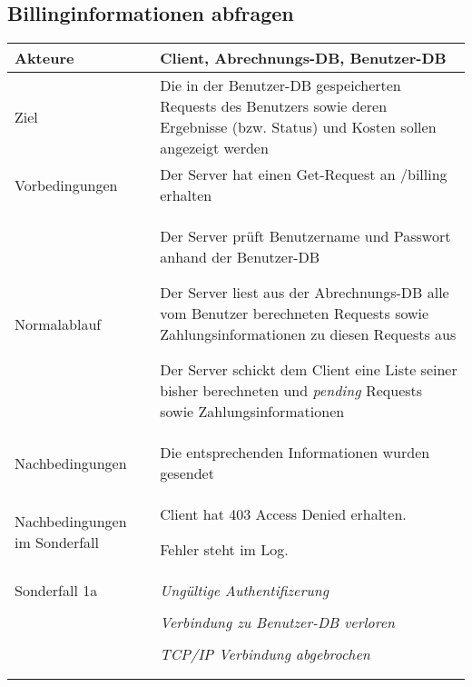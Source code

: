 \documentclass[a4paper,10pt,titlepage,parskip=true]{article}
\makeatletter
\newcommand\novspace{\@minipagetrue}
\newenvironment{owncompactitem}{%
\compactitem
}{%
\@finalstrut\@arstrutbox
\@nameuse{endcompactitem}%
\aftergroup\let\aftergroup\@finalstrut\aftergroup\@gobble
}
\newenvironment{owncompactenum}{%
\compactenum
}{%
\@finalstrut\@arstrutbox
\@nameuse{endcompactenum}%
\aftergroup\let\aftergroup\@finalstrut\aftergroup\@gobble
}
\newcommand{\usecase}[7]
{\subsection{#1}
\setlength{\extrarowheight}{2pt}
\begin{tabular}{|p{0.2\textwidth}|p{0.9\textwidth}|}
\hline
  Akteure & #2\\\hline
  Ziel & #3\\\hline
  Vorbedingungen & \novspace
  	\begin{owncompactitem}[-] #4 \end{owncompactitem} \\\hline
  Normalablauf & \vspace{-7pt}
  	\begin{owncompactenum}[1.] #6 \end{owncompactenum} \\\hline
  Nachbedingungen & \novspace
  	\begin{owncompactitem}[-] #5 \end{owncompactitem} \\\hline
  #7
\end{tabular}
}
\newcommand{\sonderfall}[4][\empty]
{
Sonderfall #2 & \vspace{-10pt}
	\textit{#3}
	\begin{owncompactenum}[{#2}.1] {#4} \end{owncompactenum}
  	\ifthenelse{\equal{#1}{\empty}}
    	{\\\hline} %
    	{\ensuremath{\rightarrow} #1 \\ [+1pt] \hline} %

}
\newcommand{\sondernachbedingung}[1]
{
Nachbedingungen im Sonderfall& \novspace
	\begin{owncompactitem}[-]
		#1
	\end{owncompactitem} \\\hline
}
\makeatother
\begin{document}
\usecase{Billinginformationen abfragen}{Client, Abrechnungs-DB, Benutzer-DB}%
{Die in der Benutzer-DB gespeicherten Requests des Benutzers sowie deren Ergebnisse (bzw. Status) und Kosten sollen angezeigt werden}%
{%
  \item Der Server hat einen Get-Request an /billing erhalten
}
{%
  \item Die entsprechenden Informationen wurden gesendet
}
{%
  \item Der Server prüft Benutzername und Passwort anhand der Benutzer-DB
  \item Der Server liest aus der Abrechnungs-DB alle vom Benutzer berechneten Requests sowie Zahlungsinformationen zu diesen Requests aus
  \item Der Server schickt dem Client eine Liste seiner bisher berechneten und \textit{pending} Requests sowie Zahlungsinformationen
}
{%
  \sondernachbedingung{
	\item Client hat 403 Access Denied erhalten.
	\item Fehler steht im Log.
	}
		\sonderfall[Weiter mit normalem Betrieb]{1a}
    {Ungültige Authentifizerung}
    {
    \item Fehler wird ins Log geschrieben
  	\item Der Client erhält eine entsprechende Fehlermeldung mit HTTP-Status 403 Access Denied
    }
	\sonderfall[Kritischer Fehler, Server ist beendet]{*}%
	{Verbindung zu Benutzer-DB verloren}%
  	{
	\item Der Fehler wird ins Log geschrieben (als schwerwiegender Fehler)
	\item Der Client erhält eine entsprechende Fehlermeldung
	\item Der Server wird beendet
  	}

\sonderfall[Weiter mit normalem Betrieb]{**}%
	{TCP/IP Verbindung abgebrochen}%
	{
	\item Fehlermeldung wird ins Log geschrieben
	}
}

\end{document}
